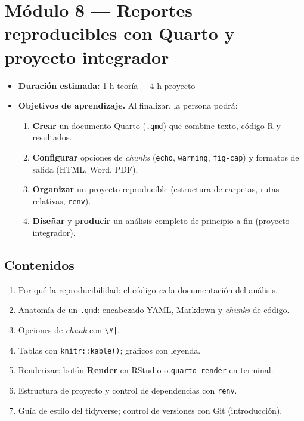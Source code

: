 \chapter{Módulo 8 --- Reportes reproducibles con Quarto y proyecto
integrador}

\begin{itemize}
\tightlist
\item
  \textbf{Duración estimada:} 1 h teoría + 4 h proyecto
\item
  \textbf{Objetivos de aprendizaje.} Al finalizar, la persona podrá:

  \begin{enumerate}
  \def\labelenumi{\arabic{enumi}.}
  \tightlist
  \item
    \textbf{Crear} un documento Quarto (\passthrough{\lstinline!.qmd!})
    que combine texto, código R y resultados.
  \item
    \textbf{Configurar} opciones de \emph{chunks}
    (\passthrough{\lstinline!echo!}, \passthrough{\lstinline!warning!},
    \passthrough{\lstinline!fig-cap!}) y formatos de salida (HTML, Word,
    PDF).
  \item
    \textbf{Organizar} un proyecto reproducible (estructura de carpetas,
    rutas relativas, \passthrough{\lstinline!renv!}).
  \item
    \textbf{Diseñar} y \textbf{producir} un análisis completo de
    principio a fin (proyecto integrador).
  \end{enumerate}
\end{itemize}

\section{Contenidos}

\begin{enumerate}
\def\labelenumi{\arabic{enumi}.}
\tightlist
\item
  Por qué la reproducibilidad: el código \emph{es} la documentación del
  análisis.
\item
  Anatomía de un \passthrough{\lstinline!.qmd!}: encabezado YAML,
  Markdown y \emph{chunks} de código.
\item
  Opciones de \emph{chunk} con \passthrough{\lstinline!\#|!}.
\item
  Tablas con \passthrough{\lstinline!knitr::kable()!}; gráficos con
  leyenda.
\item
  Renderizar: botón \textbf{Render} en RStudio o
  \passthrough{\lstinline!quarto render!} en terminal.
\item
  Estructura de proyecto y control de dependencias con
  \passthrough{\lstinline!renv!}.
\item
  Guía de estilo del tidyverse; control de versiones con Git
  (introducción).
\end{enumerate}

